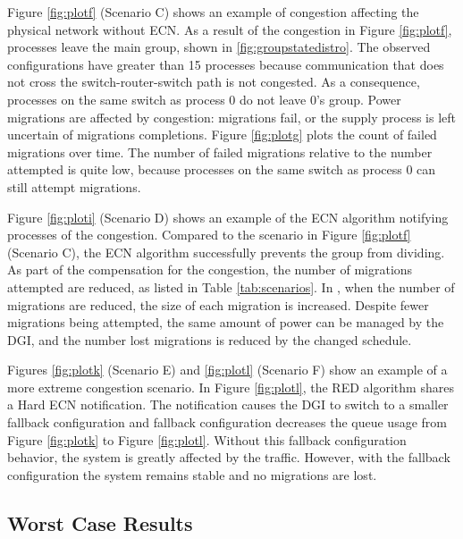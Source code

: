 Figure \ref{fig:plotf} (Scenario C) shows an example of congestion affecting the physical network without \ac{ECN}.
As a result of the congestion in Figure \ref{fig:plotf}, processes leave the main group, shown in \ref{fig:groupstatedistro}.
The observed configurations have greater than 15 processes because communication that does not cross the switch-router-switch path is not congested.
As a consequence, processes on the same switch as process 0 do not leave 0's group.
Power migrations are affected by congestion: migrations fail, or the supply process is left uncertain of migrations completions.
Figure \ref{fig:plotg} plots the count of failed migrations over time.
The number of failed migrations relative to the number attempted is quite low, because processes on the same switch as process 0 can still attempt migrations.


Figure \ref{fig:ploti} (Scenario D) shows an example of the \ac{ECN} algorithm notifying processes of the congestion.
Compared to the scenario in Figure \ref{fig:plotf} (Scenario C), the \ac{ECN} algorithm successfully prevents the group from dividing.
As part of the compensation for the congestion, the number of migrations attempted are reduced, as listed in Table \ref{tab:scenarios}.
In \cite{ecn-cloudhari}, when the number of migrations are reduced, the size of each migration is increased.
Despite fewer migrations being attempted, the same amount of power can be managed by the \ac{DGI}, and the number lost migrations is reduced by the changed schedule.

Figures \ref{fig:plotk} (Scenario E) and \ref{fig:plotl} (Scenario F) show an example of a more extreme congestion scenario.
In Figure \ref{fig:plotl}, the \ac{RED} algorithm shares a Hard \ac{ECN} notification.
The notification causes the \ac{DGI} to switch to a smaller fallback configuration and fallback configuration decreases the queue usage from Figure \ref{fig:plotk} to Figure \ref{fig:plotl}.
Without this fallback configuration behavior, the system is greatly affected by the traffic.
However, with the fallback configuration the system remains stable and no migrations are lost.

\subsection{Worst Case Results}

